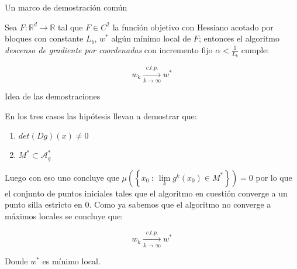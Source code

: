 \documentclass{beamer}
\newcommand{\puntosfijos}{\mathcal{A}_{g}^{*}}
\newcommand{\R}{{\mathbb{R}}}
\newcommand{\sett}[1]{\left\lbrace#1\right\rbrace}
\newcommand{\Biglim}[2]{\lim\limits_{#1}{#2}}
\begin{document}
\begin{frame}{Un marco de demostraci\'on com\'un}

\begin{theorem}
	Sea $F: \R^d \rightarrow \R$ tal que $F \in C^2$  la funci\'on objetivo con Hessiano acotado por bloques con constante $L_b$, $w^*$ alg\'un m\'inimo local de $F$; entonces el algoritmo \textit{descenso de gradiente por coordenadas} con incremento fijo $\alpha < \frac{1}{L_b}$ cumple:
	
	\begin{equation*}
	w_k \xrightarrow[k \rightarrow \infty]{c.t.p.} w^*
	\end{equation*}
	
\end{theorem}
\end{frame}

\begin{frame}{Idea de las demostraciones}

En los tres casos las hip\'otesis llevan a demostrar que:

\begin{enumerate}
	\item 	$det\left(Dg\right)(x) \neq 0$
	\item $M^* \subset \puntosfijos$
\end{enumerate}

Luego con eso uno concluye que $\mu(\sett{x_0 \ \colon \ \Biglim{k}{g^k(x_0) \in M^*}}) =0$ por lo que el conjunto de puntos iniciales tales que el algoritmo en cuesti\'on converge a un punto silla estricto en $0$. Como ya sabemos que el algoritmo no converge a m\'aximos locales se concluye que:

	\begin{equation*}
w_k \xrightarrow[k \rightarrow \infty]{c.t.p.} w^*
\end{equation*}

Donde $w^*$ es m\'inimo local.

\end{frame}
\end{document}
